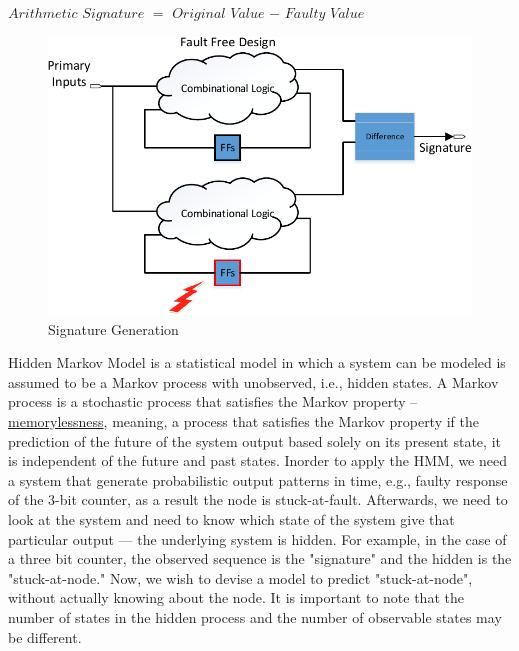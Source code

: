 \begin{center}
$Arithmetic$ $Signature$ $=$ $Original$ $Value$ $-$ $Faulty$ $Value$
\end{center}



 \begin{figure}[tb!]

 \centering
  \captionsetup{justification=centering}    
   \includegraphics[scale=0.8]{Figures/signature1.pdf}
   \caption{Signature Generation}
\label{fig:SG}
\end{figure}




Hidden Markov Model is a statistical model in which a system can be modeled is assumed to be a Markov process with unobserved, i.e., hidden states. A Markov process  is a stochastic process that satisfies the Markov property -- \underline{memorylessness}, meaning, a process that satisfies the Markov property if the prediction of the future of the system output based solely on its present state, it is independent of the future and past states. Inorder to apply the HMM, we need a system that generate probabilistic output patterns in time, e.g., faulty response of the 3-bit counter, as a result the node is stuck-at-fault. Afterwards, we need to look at the system and need to know which state of the system give that particular output ---  the underlying system is hidden. For example, in the case of a three bit counter, the observed sequence is the "signature" and the hidden is the "stuck-at-node." Now, we wish to devise a model to predict "stuck-at-node", without actually knowing about the node. It is important to note that the number of states in the hidden process and the number of observable states may be different. 



